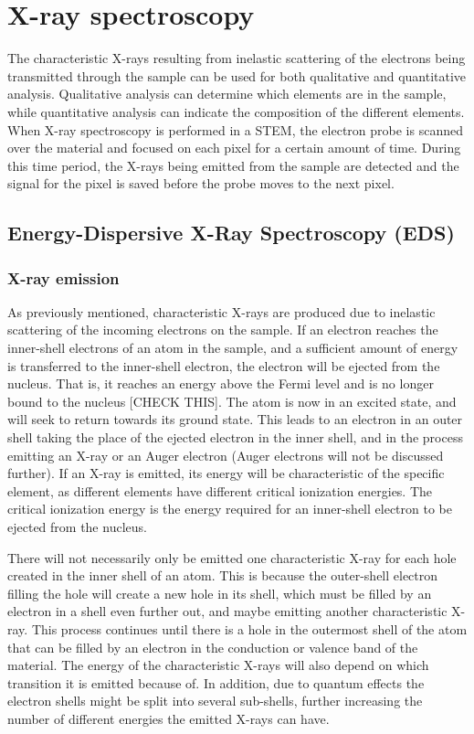\section{X-ray spectroscopy}\label{EDS}
The characteristic X-rays resulting from inelastic scattering of the electrons being transmitted through the sample can be used for both qualitative and quantitative analysis. Qualitative analysis can determine which elements are in the sample, while quantitative analysis can indicate the composition of the different elements. When X-ray spectroscopy is performed in a STEM, the electron probe is scanned over the material and focused on each pixel for a certain amount of time. During this time period, the X-rays being emitted from the sample are detected and the signal for the pixel is saved before the probe moves to the next pixel. 

	\subsection{Energy-Dispersive X-Ray Spectroscopy (EDS)} %
		\subsubsection{X-ray emission}
As previously mentioned, characteristic X-rays are produced due to inelastic scattering of the incoming electrons on the sample. If an electron reaches the inner-shell electrons of an atom in the sample, and a sufficient amount of energy is transferred to the inner-shell electron, the electron will be ejected from the nucleus. That is, it reaches an energy above the Fermi level and is no longer bound to the nucleus [CHECK THIS]. The atom is now in an excited state, and will seek to return towards its ground state. This leads to an electron in an outer shell taking the place of the ejected electron in the inner shell, and in the process emitting an X-ray or an Auger electron (Auger electrons will not be discussed further). If an X-ray is emitted, its energy will be characteristic of the specific element, as different elements have different critical ionization energies. The critical ionization energy is the energy required for an inner-shell electron to be ejected from the nucleus.

There will not necessarily only be emitted one characteristic X-ray for each hole created in the inner shell of an atom. This is because the outer-shell electron filling the hole will create a new hole in its shell, which must be filled by an electron in a shell even further out, and maybe emitting another characteristic X-ray. This process continues until there is a hole in the outermost shell of the atom that can be filled by an electron in the conduction or valence band of the material. The energy of the characteristic X-rays will also depend on which transition it is emitted because of. In addition, due to quantum effects the electron shells might be split into several sub-shells, further increasing the number of different energies the emitted X-rays can have.

